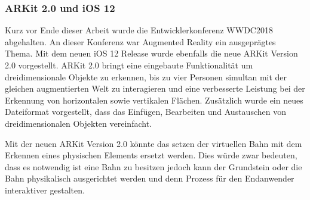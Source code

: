 \subsubsection{ARKit 2.0 und iOS 12}
Kurz vor Ende dieser Arbeit wurde die Entwicklerkonferenz WWDC2018 abgehalten. An dieser Konferenz war Augmented Reality ein ausgeprägtes Thema. Mit dem neuen iOS 12 Release wurde ebenfalls die neue ARKit Version 2.0 vorgestellt. ARKit 2.0 bringt eine eingebaute Funktionalität um dreidimensionale Objekte zu erkennen, bis zu vier Personen simultan mit der gleichen augmentierten Welt zu interagieren und eine verbesserte Leistung bei der Erkennung von horizontalen sowie vertikalen Flächen. Zusätzlich wurde ein neues Dateiformat vorgestellt, dass das Einfügen, Bearbeiten und Austauschen von dreidimensionalen Objekten vereinfacht. 

Mit der neuen ARKit Version 2.0 könnte das setzen der virtuellen Bahn mit dem Erkennen eines physischen Elements ersetzt werden. Dies würde zwar bedeuten, dass es notwendig ist eine Bahn zu besitzen jedoch kann der Grundstein oder die Bahn physikalisch ausgerichtet werden und denn Prozess für den Endanwender interaktiver gestalten.
